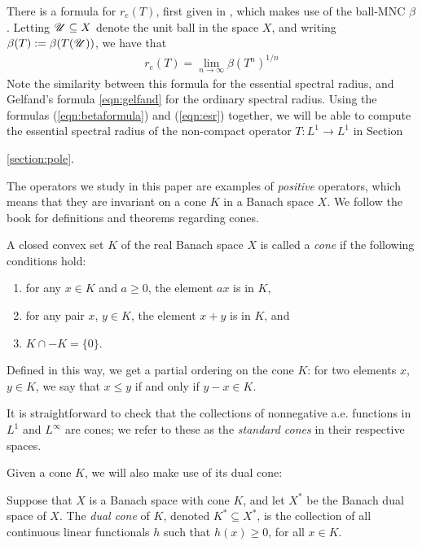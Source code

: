 There is a formula for $r_e(T)$, first given in \cite{Nussbaum1970}, which makes use of the ball-MNC $\beta$. Letting $\mathscr U \subseteq X$ denote the unit ball in the space $X$, and writing $\beta(T) := \beta(T(\mathscr U))$, we have that
\begin{align}
	r_e(T) = \lim_{n \to \infty} \beta(T^n)^{1/n} \label{eqn:esr}
\end{align}
Note the similarity between this formula for the essential spectral radius, and Gelfand's formula \eqref{eqn:gelfand} for the ordinary spectral radius. Using the formulas (\ref{eqn:betaformula}) and (\ref{eqn:esr}) together, we will be able to compute the essential spectral radius of the non-compact operator $T:L^1 \to L^1$ in Section {\ref{section:pole}.

The operators we study in this paper are examples of \emph{positive} operators, which means that they are invariant on a cone $K$ in a Banach space $X$. We follow the book \cite{Kras1989} for definitions and theorems regarding cones.
	\begin{definition}
		A closed convex set $K$ of the real Banach space $X$ is called a \emph{cone} if the following conditions hold:
		\begin{enumerate}
			\item for any $x \in K$ and $a \geq 0$, the element $ax$ is in $K$,
			\item for any pair $x$, $y \in K$, the element $x +y$ is in $K$, and 
			\item $K \cap -K = \{0\}$.
		\end{enumerate}
	\end{definition}
	
	Defined in this way, we get a partial ordering on the cone $K$: for two elements $x$, $y \in K$, we say that $x \leq y$ if and only if $y-x \in K$. 
	
	It is straightforward to check that the collections of nonnegative a.e. functions in $L^1$ and $L^\infty$ are cones; we refer to these as the \emph{standard cones} in their respective spaces.
	
	Given a cone $K$, we will also make use of its dual cone:
	
	\begin{definition}
		Suppose that $X$ is a Banach space with cone $K$, and let $X^*$ be the Banach dual space of $X$. The \emph{dual cone} of $K$, denoted $K^* \subseteq X^*$, is the collection of all continuous linear functionals $h$ such that $h(x) \geq 0$, for all $x \in K$.
	\end{definition}
	
}
